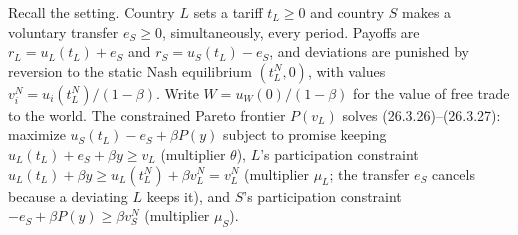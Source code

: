 \documentclass[11pt,letterpaper,reqno]{amsart}
\begin{document}
Recall the setting.  Country $L$ sets a tariff $t_L\ge0$ and country $S$ makes a voluntary transfer $e_S\ge0$, simultaneously, every period.  Payoffs are $r_L=u_L(t_L)+e_S$ and
$r_S=u_S(t_L)-e_S$, and deviations are punished by reversion to the static Nash equilibrium $(t_L^N,0)$, with values $v_i^N=u_i(t_L^N)/(1-\beta)$.  Write $W=u_W(0)/(1-\beta)$ for
the value of free trade to the world.  The constrained Pareto frontier $P(v_L)$ solves (26.3.26)--(26.3.27): maximize $u_S(t_L)-e_S+\beta P(y)$ subject to promise keeping
$u_L(t_L)+e_S+\beta y\ge v_L$ (multiplier $\theta$), $L$'s participation constraint $u_L(t_L)+\beta y\ge u_L(t_L^N)+\beta v_L^N=v_L^N$ (multiplier $\mu_L$; the transfer $e_S$ cancels
because a deviating $L$ keeps it), and $S$'s participation constraint $-e_S+\beta P(y)\ge\beta v_S^N$ (multiplier $\mu_S$).
\end{document}
